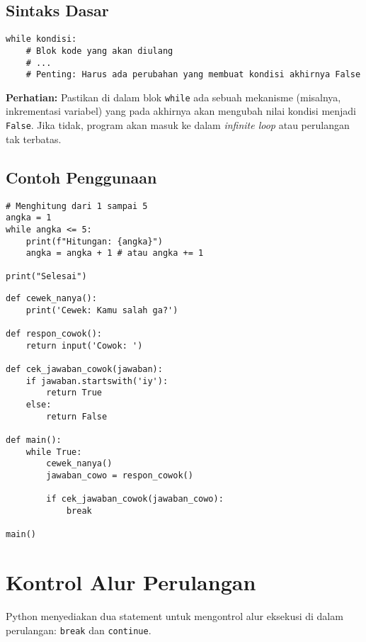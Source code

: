 \subsection{Sintaks Dasar}
\begin{lstlisting}[style=PythonStyle, caption={Sintaks Dasar Perulangan while}]
while kondisi:
    # Blok kode yang akan diulang
    # ...
    # Penting: Harus ada perubahan yang membuat kondisi akhirnya False
\end{lstlisting}

\textbf{Perhatian:} Pastikan di dalam blok \texttt{while} ada sebuah mekanisme (misalnya, inkrementasi variabel) yang pada akhirnya akan mengubah nilai kondisi menjadi \texttt{False}. Jika tidak, program akan masuk ke dalam \textit{infinite loop} atau perulangan tak terbatas.

\subsection{Contoh Penggunaan}
\begin{lstlisting}[style=PythonStyle, caption={Kode Python: while_loop.py}]
# Menghitung dari 1 sampai 5
angka = 1
while angka <= 5:
    print(f"Hitungan: {angka}")
    angka = angka + 1 # atau angka += 1

print("Selesai")
\end{lstlisting}

\begin{lstlisting}[style=PythonStyle, caption={Kode Python: cowok_selalu_salah.py}]
def cewek_nanya():
    print('Cewek: Kamu salah ga?')

def respon_cowok():
    return input('Cowok: ')

def cek_jawaban_cowok(jawaban):
    if jawaban.startswith('iy'):
        return True
    else:
        return False
    
def main():
    while True:
        cewek_nanya()
        jawaban_cowo = respon_cowok()

        if cek_jawaban_cowok(jawaban_cowo):
            break

main()
\end{lstlisting}

\section{Kontrol Alur Perulangan}
Python menyediakan dua statement untuk mengontrol alur eksekusi di dalam perulangan: \texttt{break} dan \texttt{continue}.


